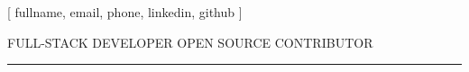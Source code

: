 
\hypersetup{
    colorlinks=true,
    linkcolor=blue,
    urlcolor=black,
}




\newlength{\fullcollw}
\setlength{\fullcollw}{0.42\textwidth}

\renewcommand\familydefault{\sfdefault} 

\pagestyle{empty}

\def \separator {
    \textbf{\Large\textbullet}
}

\newcommand{\email}[1]{\href{mailto:#1}{#1}}%
\newcommand{\profilelink}[1]{\href{https://#1}{#1}}%

\newcommand{\isA}[1]{
    \expandafter\ifstrequal\expandafter{#1}{default}{}{a}
}

\newcommand\sectionTitle[1]{%
    \begingroup
        \large{\textbf{\MakeUppercase{#1}}}
        \vspace{0.4em}
        \hrule
        \vspace{-0.3em}
    \endgroup
}%


\newcommand\printNameTitle[1]{%
    \begingroup
        \hfill{\MakeUppercase{\Huge\bfseries #1}}\hfill
        \vspace{0.5em}
        \break
        {
            \MakeUppercase{full-stack developer}\separator\MakeUppercase{Open source contributor}
        }
        \break
        \vspace{-0.5em}
        \hrule
        \vspace{-0.25em}
    \endgroup
}%

\newkeycommand{\introduction}[
    fullname,
    email,
    phone,
    linkedin,
    github
]{%
    \begin{center}%
        \printNameTitle{}%
        {
        \hfill
         \email{} \hfill
         \profilelink{} \hfill
         \profilelink{} \hfill
          \hfill
        }
    \end{center}%
}%


